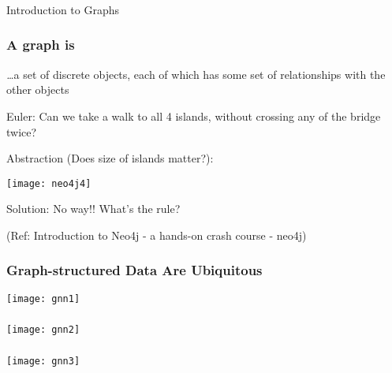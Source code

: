 \begin{frame}[fragile]\frametitle{}
\begin{center}
{\Large Introduction to Graphs}
\end{center}
\end{frame}



\begin{frame}\frametitle{A graph is}
{\emph \ldots a set of discrete objects, each of which has some set of relationships with the other objects}

Euler: Can we take a walk to all 4 islands, without crossing any of the bridge twice?

Abstraction (Does size of islands matter?):

\begin{center}
\texttt{[image: neo4j4]}
\end{center}	  

Solution: No way!! What's the rule?

{\tiny (Ref: Introduction to Neo4j - a hands-on crash course - neo4j)}
\end{frame}


\begin{frame}[fragile]\frametitle{ Graph-structured Data Are Ubiquitous }

\begin{center}
\texttt{[image: gnn1]}
\end{center}	  

\end{frame}

\begin{frame}[fragile]\frametitle{}

\begin{center}
\texttt{[image: gnn2]}
\end{center}	  

\end{frame}

\begin{frame}[fragile]\frametitle{}

\begin{center}
\texttt{[image: gnn3]}
\end{center}	  

\end{frame}


